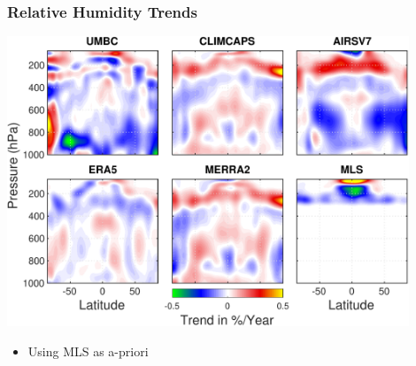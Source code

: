 \documentclass[10pt,t]{beamer}
\begin{document}
\begin{frame}
\frametitle{Relative Humidity Trends}
\vspace{-0.15in}
\begin{center}
\includegraphics[width=0.9\textwidth]{Figslls/tiled_all_N_RH_trend_withmls_start.pdf}
\end{center}
\small
\begin{itemize}
\item Using MLS as a-priori 
\end{itemize}
\end{frame}
\end{document}
